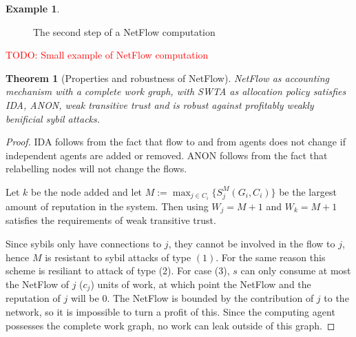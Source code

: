 \documentclass[a4paper,11pt]{book}
\newcommand\musthave[1]{\textcolor{red}{TODO: #1}}
\newtheorem{theorem}{Theorem}
\theoremstyle{definition}
\newtheorem*{example}{Example}
\begin{document}
\begin{example}
\begin{figure}[h]
     \caption{The second step of a NetFlow computation}
     \label{fig:ex_nf_2}
\end{figure}


\musthave{Small example of NetFlow computation}


   
\end{example}

\begin{theorem}[Properties and robustness of NetFlow]
    NetFlow as accounting mechanism with a complete work graph, with SWTA as allocation policy
    satisfies IDA, ANON, weak transitive trust and is robust against
    profitably weakly benificial sybil attacks.

    \label{thm:prop-rob-NetFlow}
\end{theorem}


\begin{proof}
    IDA follows from the fact that flow to and from agents does not change if independent agents
    are added or removed. ANON follows from the fact that relabelling nodes will not change the flows.

    Let $k$ be the node added and let 
    $M := \max_{j \in C_i}\{S^M_j(G_i, C_i)\}$ be the largest amount of reputation in the system.
    Then using $W_j = M+1$ and $W_k = M+1$ satisfies the requirements of weak transitive trust.

    Since sybils only have connections to $j$, they cannot be involved in the flow to $j$, hence
    $M$ is resistant to sybil attacks of type $(1)$. For the same reason this scheme is resiliant
    to attack of type (2). For case (3), $s$ can only consume at most the NetFlow of $j$ ($c_j$)
    units of work, at which point the NetFlow and the reputation of $j$ will be $0$. The NetFlow
    is bounded by the contribution of $j$ to the network, so it is impossible to turn a profit of this.
    Since the computing agent possesses the complete work graph, no work can leak outside of this graph.
\end{proof}
\end{document}
